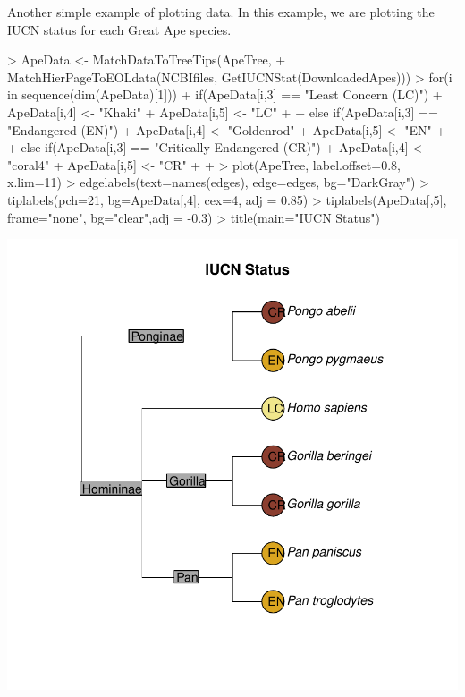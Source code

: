 \documentclass[12pt]{article}
\begin{document}
 
Another simple example of plotting data.  In this example, we are plotting the IUCN status for each Great Ape species.  
 \begin {center}
\begin{Schunk}
\begin{Sinput}
> ApeData <- MatchDataToTreeTips(ApeTree, 
+      MatchHierPageToEOLdata(NCBIfiles, GetIUCNStat(DownloadedApes)))
>   for(i in sequence(dim(ApeData)[1])) {
+     if(ApeData[i,3] == "Least Concern (LC)") {
+       ApeData[i,4] <- "Khaki"
+       ApeData[i,5] <- "LC"
+     }  
+     else if(ApeData[i,3] == "Endangered (EN)") {
+       ApeData[i,4] <- "Goldenrod"
+       ApeData[i,5] <- "EN"
+     }
+     else if(ApeData[i,3] == "Critically Endangered (CR)") {
+       ApeData[i,4] <- "coral4"
+       ApeData[i,5] <- "CR"
+     }
+   }
> plot(ApeTree, label.offset=0.8, x.lim=11)
> edgelabels(text=names(edges), edge=edges, bg="DarkGray")
> tiplabels(pch=21, bg=ApeData[,4], cex=4, adj = 0.85)
> tiplabels(ApeData[,5], frame="none", bg="clear",adj = -0.3)
> title(main="IUCN Status")
\end{Sinput}
\end{Schunk}
\includegraphics{ReolUserManual-018}
\end{center}

 
 
\end{document}
